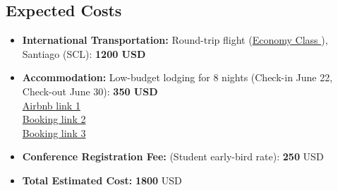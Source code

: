\subsection{Expected Costs}
\vspace{0.5cm}
\begin{itemize}
    \item \textbf{International Transportation:} Round-trip flight (\href{https://www.google.com/travel/flights/search?tfs=CBwQAhooEgoyMDI1LTA2LTIyagwIAhIIL20vMGRscXZyDAgDEggvbS8wNXF0ahooEgoyMDI1LTA2LTMwagwIAxIIL20vMDVxdGpyDAgCEggvbS8wZGxxdkABSAFwAYIBCwj___________8BmAEB}{Economy Class }), Santiago (SCL): \textbf{1200 USD}
    \item \textbf{Accommodation:} Low-budget lodging for 8 nights (Check-in June 22, Check-out June 30): \textbf{350 USD} \\
    \href{https://www.airbnb.cl/rooms/43672051?adults=1&check_in=2025-06-15&check_out=2025-06-23&search_mode=regular_search&source_impression_id=p3_1746108875_P3j1RylpBInPYmaA&previous_page_section_name=1000&federated_search_id=3869dce9-fdc6-437c-be28-d73b08091c33}{Airbnb link 1} \\
    \href{https://www.booking.com/hotel/fr/coffice-paris.es.html?label=es-cl-booking-desktop-LVoANQ22b9Q1GvFzlorfdQS652829001271%3Apl%3Ata%3Ap1%3Ap2%3Aac%3Aap%3Aneg%3Afi%3Atikwd-65526620%3Alp9198254%3Ali%3Adec%3Adm&aid=2311236&ucfs=1&checkin=2025-06-15&checkout=2025-06-23&dest_id=-1456928&dest_type=city&group_adults=1&no_rooms=1&group_children=0&nflt=price%3DCLP-min-100000-1&srpvid=26dd650ee78d026f&srepoch=1746109375&matching_block_id=479849501_285200522_1_0_0&atlas_src=sr_iw_title}{Booking link 2} \\
    \href{https://www.booking.com/hotel/fr/chez-mia-paris-paris.es.html?label=es-cl-booking-desktop-LVoANQ22b9Q1GvFzlorfdQS652829001271%3Apl%3Ata%3Ap1%3Ap2%3Aac%3Aap%3Aneg%3Afi%3Atikwd-65526620%3Alp9198254%3Ali%3Adec%3Adm&aid=2311236&ucfs=1&checkin=2025-06-15&checkout=2025-06-23&dest_id=-1456928&dest_type=city&group_adults=1&no_rooms=1&group_children=0&nflt=price%3DCLP-min-100000-1&srpvid=26dd650ee78d026f&srepoch=1746109375&matching_block_id=1258054601_410961765_0_0_0&atlas_src=sr_iw_title}{Booking link 3}
    \item \textbf{Conference Registration Fee:} (Student early-bird rate): \textbf{250} USD
    \item \textbf{Total Estimated Cost:} \textbf{1800} USD
\end{itemize}

\vspace{0.5cm}


